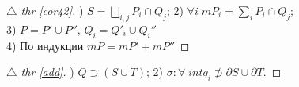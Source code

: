 
\begin{minipage}[t]{0.45\textwidth}
\begin{proof}[
\hypertarget{cor_link}{$\triangle$} 
thr \eqref{cor42}]

\phantom{42}

)  $S = \bigsqcup _{i, j} P_i \cap Q_j$;
2) $\forall i\; mP_i = \sum_i{P_i \cap Q_j} $; \\
3) $P = P' \cup P''$, $Q_i = Q'_i \cup Q_i''$ \\
4) По индукции $mP = mP' + mP''$
\end{proof}

\end{minipage}
\hfill
\begin{minipage}[t]{0.45\textwidth}
\begin{proof}[
{$\triangle$} 
thr \eqref{add}]

\phantom{42}

) $Q \supset (S \cup T)$; 2) $\sigma \colon \forall\; int q_i \not \supset \partial S \cup \partial T$.
\end{proof}
\end{minipage}  

